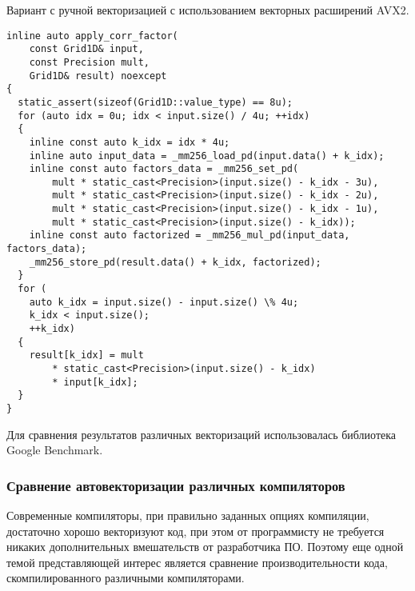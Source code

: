Вариант с ручной векторизацией с использованием векторных расширений AVX2.

\begin{lstlisting}[style={CppCodeStyle}]
inline auto apply_corr_factor(
	const Grid1D& input,
	const Precision mult,
	Grid1D& result) noexcept
{
  static_assert(sizeof(Grid1D::value_type) == 8u);
  for (auto idx = 0u; idx < input.size() / 4u; ++idx)
  {
    inline const auto k_idx = idx * 4u;
    inline auto input_data = _mm256_load_pd(input.data() + k_idx);
    inline const auto factors_data = _mm256_set_pd(
        mult * static_cast<Precision>(input.size() - k_idx - 3u),
        mult * static_cast<Precision>(input.size() - k_idx - 2u),
        mult * static_cast<Precision>(input.size() - k_idx - 1u),
        mult * static_cast<Precision>(input.size() - k_idx));
    inline const auto factorized = _mm256_mul_pd(input_data, factors_data);
    _mm256_store_pd(result.data() + k_idx, factorized);
  }
  for (
  	auto k_idx = input.size() - input.size() \% 4u;
  	k_idx < input.size();
  	++k_idx) 
  {
    result[k_idx] = mult
    	* static_cast<Precision>(input.size() - k_idx)
    	* input[k_idx];
  }
}
\end{lstlisting}

Для сравнения результатов различных векторизаций использовалась библиотека Google Benchmark.

\subsubsection{Сравнение автовекторизации различных компиляторов}

Современные компиляторы, при правильно заданных опциях компиляции, достаточно хорошо векторизуют код,
при этом от программисту не требуется никаких дополнительных вмешательств от разработчика ПО.
Поэтому еще одной темой представляющей интерес является сравнение производительности кода,
скомпилированного различными компиляторами.


